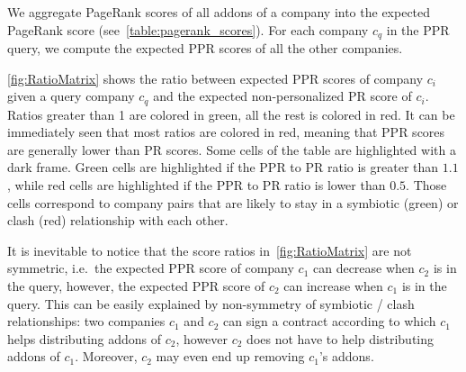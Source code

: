 \documentclass[11pt,oneside]{book}
\begin{document}
We aggregate PageRank scores of all addons of a company into the expected PageRank score (see~\autoref{table:pagerank_scores}). For each company $c_q$ in the PPR query, we compute the expected PPR scores of all the other companies. 


\autoref{fig:RatioMatrix} shows the ratio between expected PPR scores of company $c_i$ given a query company $c_q$ and the expected non-personalized PR score of $c_i$. Ratios greater than 1 are colored in green, all the rest is colored in red. It can be immediately seen that most ratios are colored in red, meaning that PPR scores are generally lower than PR scores. Some cells of the table are highlighted with a dark frame. Green cells are highlighted if the PPR to PR ratio is greater than $1.1$, while red cells are highlighted if the PPR to PR ratio is lower than $0.5$. Those cells correspond to company pairs that are likely to stay in a symbiotic (green) or clash (red) relationship with each other.

It is inevitable to notice that the score ratios in~\autoref{fig:RatioMatrix} are not symmetric, i.e.~the expected PPR score of company $c_1$ can decrease when $c_2$ is in the query, however, the expected PPR score of $c_2$ can increase when $c_1$ is in the query. This can be easily explained by non-symmetry of symbiotic / clash relationships: two companies $c_1$ and $c_2$ can sign a contract according to which $c_1$ helps distributing addons of $c_2$, however $c_2$ does not have to help distributing addons of $c_1$. Moreover, $c_2$ may even end up removing $c_1$'s addons. 
\end{document}
